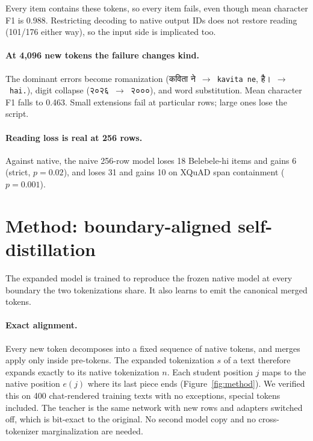 \documentclass[11pt]{article}
\newcommand{\hi}[1]{{\devfont #1}}
\begin{document}
Every item contains these tokens, so every item fails, even though mean character F1 is 0.988. Restricting decoding to native output IDs does not restore reading (101/176 either way), so the input side is implicated too.

\paragraph{At 4,096 new tokens the failure changes kind.} The dominant errors become romanization (\hi{कविता ने}~$\to$~\texttt{kavita ne}, \hi{है।}~$\to$~\texttt{hai.}), digit collapse (\hi{२०२६}~$\to$~\hi{२०००}), and word substitution. Mean character F1 falls to 0.463. Small extensions fail at particular rows; large ones lose the script.

\paragraph{Reading loss is real at 256 rows.} Against native, the naive 256-row model loses 18 Belebele-hi items and gains 6 (strict, $p=0.02$), and loses 31 and gains 10 on XQuAD span containment ($p=0.001$).

\section{Method: boundary-aligned self-distillation}
\label{sec:method}

The expanded model is trained to reproduce the frozen native model at every boundary the two tokenizations share. It also learns to emit the canonical merged tokens.

\paragraph{Exact alignment.} Every new token decomposes into a fixed sequence of native tokens, and merges apply only inside pre-tokens. The expanded tokenization $s$ of a text therefore expands exactly to its native tokenization $n$. Each student position $j$ maps to the native position $e(j)$ where its last piece ends (Figure~\ref{fig:method}). We verified this on 400 chat-rendered training texts with no exceptions, special tokens included. The teacher is the same network with new rows and adapters switched off, which is bit-exact to the original. No second model copy and no cross-tokenizer marginalization are needed.
\end{document}
